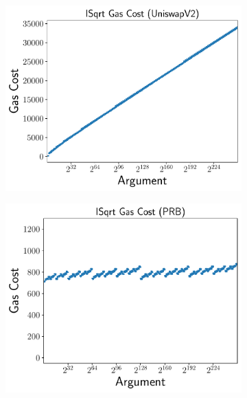 \begin{figure}[p]
\centering
    \begin{subfigure}[t]{0.45\textwidth}
    \includegraphics[width=\textwidth]{plots/plot_UniswapV2.pdf}
    \end{subfigure}
    \begin{subfigure}[t]{0.45\textwidth}
    \includegraphics[width=\textwidth]{plots/plot_PRB.pdf}
    \end{subfigure}


\end{figure}
